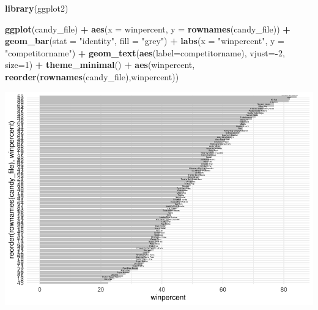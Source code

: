 \documentclass[
]{article}
\newenvironment{Shaded}{\begin{snugshade}}{\end{snugshade}}
\newcommand{\AttributeTok}[1]{\textcolor[rgb]{0.13,0.29,0.53}{#1}}
\newcommand{\DecValTok}[1]{\textcolor[rgb]{0.00,0.00,0.81}{#1}}
\newcommand{\FunctionTok}[1]{\textcolor[rgb]{0.13,0.29,0.53}{\textbf{#1}}}
\newcommand{\NormalTok}[1]{#1}
\newcommand{\SpecialCharTok}[1]{\textcolor[rgb]{0.81,0.36,0.00}{\textbf{#1}}}
\newcommand{\StringTok}[1]{\textcolor[rgb]{0.31,0.60,0.02}{#1}}
\begin{document}
\begin{Shaded}
\begin{Highlighting}[]
\FunctionTok{library}\NormalTok{(ggplot2)}

\FunctionTok{ggplot}\NormalTok{(candy\_file) }\SpecialCharTok{+} 
  \FunctionTok{aes}\NormalTok{(}\AttributeTok{x =}\NormalTok{ winpercent, }\AttributeTok{y =} \FunctionTok{rownames}\NormalTok{(candy\_file)) }\SpecialCharTok{+}
  \FunctionTok{geom\_bar}\NormalTok{(}\AttributeTok{stat =} \StringTok{"identity"}\NormalTok{, }\AttributeTok{fill =} \StringTok{"grey"}\NormalTok{) }\SpecialCharTok{+}
  \FunctionTok{labs}\NormalTok{(}\AttributeTok{x =} \StringTok{"winpercent"}\NormalTok{, }\AttributeTok{y =} \StringTok{"competitorname"}\NormalTok{) }\SpecialCharTok{+}
  \FunctionTok{geom\_text}\NormalTok{(}\FunctionTok{aes}\NormalTok{(}\AttributeTok{label=}\NormalTok{competitorname), }\AttributeTok{vjust=}\SpecialCharTok{{-}}\DecValTok{2}\NormalTok{, }\AttributeTok{size=}\DecValTok{1}\NormalTok{) }\SpecialCharTok{+}
  \FunctionTok{theme\_minimal}\NormalTok{() }\SpecialCharTok{+} \FunctionTok{aes}\NormalTok{(winpercent, }\FunctionTok{reorder}\NormalTok{(}\FunctionTok{rownames}\NormalTok{(candy\_file),winpercent))}
\end{Highlighting}
\end{Shaded}

\includegraphics{Untitled1_files/figure-latex/unnamed-chunk-18-1.pdf}
\end{document}
